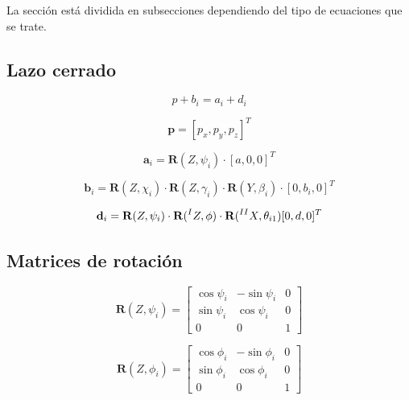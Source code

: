 \documentclass[titlepage, letterpaper, fleqn]{article}
\let\bs\mathbf
\begin{document}
La sección está dividida en subsecciones dependiendo del tipo de ecuaciones que se trate.

\subsection{Lazo cerrado} %
\label{subsec:loop_closure}


\begin{equation}
    \label{eq:loop_closure}
    p+b_i = a_i + d_i
\end{equation}

\begin{equation}
    \label{eq:p_vector}
    \bs{p} = [p_x,p_y,p_z]^T
\end{equation}

\begin{equation}
    \label{eq:a_vector}
    \bs{a}_i = \bs{R}(Z,\psi_i) \cdot [a,0,0]^T
\end{equation}

\begin{equation}
    \label{eq:b_vector}
    \bs{b}_i = \bs{R}(Z,\chi_i)\cdot \bs{R}(Z, \gamma_i) \cdot \bs{R}(Y, \beta_i) \cdot [0, b_i, 0]^T
\end{equation}

\begin{equation}
    \label{eq:d_vector}
    \bs{d}_i = \bs{R}(Z,\psi_i) \cdot \bs{R}(\prescript{I}{}{Z},\phi) \cdot \bs{R}(\prescript{II}{}{X}, \theta_{i1})[0,d,0]^T
\end{equation}

\subsection{Matrices de rotación} %
\label{subsec:rotations}

\begin{equation}
    \label{eq:rot_Z_psi}
    \bs{R}(Z,\psi_i) =
    \begin{bmatrix}
        \cos\psi_i & -\sin\psi_i & 0 \\
        \sin\psi_i & \cos\psi_i & 0 \\
        0 & 0 & 1
    \end{bmatrix}
\end{equation}

\begin{equation}
    \label{eq:rot_Z_phi}
    \bs{R}(Z,\phi_i) =
    \begin{bmatrix}
        \cos\phi_i & -\sin\phi_i & 0 \\
        \sin\phi_i & \cos\phi_i & 0 \\
        0 & 0 & 1
    \end{bmatrix}
\end{equation}
\end{document}

